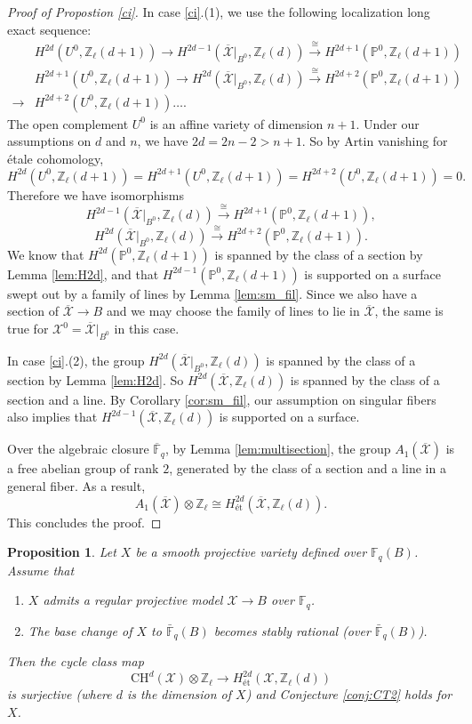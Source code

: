 \documentclass{amsart}
\newtheorem{prop}[theorem]{Proposition}
\theoremstyle{definition}
\theoremstyle{remark}
\newcommand{\mbb}{\mathbb}
\newcommand{\FF}{\mbb{F}}
\newcommand{\ZZ}{\mbb{Z}}
\newcommand{\PP}{\mbb{P}}
\newcommand{\mc}{\mathcal}
\newcommand{\mcX}{\mc{X}}
\newcommand{\et}{\text{\'et}}
\begin{document}
\begin{proof}[Proof of Propostion \ref{ci}]
In case \ref{ci}.(1), we use the following localization long exact sequence:
\begin{align*}
&H^{2d}(U^0, \ZZ_\ell(d+1))\to H^{2d-1}(\overline{\mcX}|_{B^0}, \ZZ_\ell(d)) \xrightarrow{\cong} H^{2d+1}(\PP^0, \ZZ_\ell(d+1)) \\
    &H^{2d+1}(U^0, \ZZ_\ell(d+1))\to H^{2d}(\overline{\mcX}|_{B^0}, \ZZ_\ell(d)) \xrightarrow{\cong} H^{2d+2}(\PP^0, \ZZ_\ell(d+1)) \\
    \to &H^{2d+2}(U^0, \ZZ_\ell(d+1))\ldots .
\end{align*}
The open complement $U^0$ is an affine variety of dimension $n+1$. Under our assumptions on $d$ and $n$, we have $2d=2n-2>n+1$.
So by Artin vanishing for \'etale cohomology, 
\[
H^{2d}(U^0, \ZZ_\ell(d+1))= H^{2d+1}(U^0, \ZZ_\ell(d+1))= H^{2d+2}(U^0, \ZZ_\ell(d+1))=0.
\]
Therefore we have isomorphisms
\[
H^{2d-1}(\overline{\mcX}|_{B^0}, \ZZ_\ell(d)) \xrightarrow{\cong} H^{2d+1}(\PP^0, \ZZ_\ell(d+1)), \]
\[ H^{2d}(\overline{\mcX}|_{B^0}, \ZZ_\ell(d)) \xrightarrow{\cong} H^{2d+2}(\PP^0, \ZZ_\ell(d+1)).
\]
We know that $H^{2d}(\PP^0, \ZZ_\ell(d+1))$ is spanned by the class of a section by Lemma \ref{lem:H2d}, and that $H^{2d-1}(\PP^0, \ZZ_\ell(d+1))$ is supported on a surface swept out by a family of lines by Lemma \ref{lem:sm_fil}.
Since we also have a section of $\overline{\mcX} \to B$ and we may choose the family of lines to lie in $\overline{\mcX}$, the same is true for $\mcX^0=\overline{\mcX}|_{B^0}$ in this case.


In case \ref{ci}.(2), the group $H^{2d}(\overline{\mcX}|_{B^0}, \ZZ_\ell(d))$ is spanned by the class of a section by Lemma \ref{lem:H2d}.
So $H^{2d}(\overline{\mcX}, \ZZ_\ell(d))$ is spanned by the class of a section and a line.
By Corollary \ref{cor:sm_fil}, our assumption on singular fibers also implies that $H^{2d-1}(\overline{\mcX}, \ZZ_\ell(d))$ is supported on a surface.


Over the algebraic closure $\overline{\FF}_q$,  by Lemma \ref{lem:multisection}, the group $A_1(\overline{\mcX})$ is a free abelian group of rank $2$, generated by the class of a section and a line in a general fiber.
As a result, \[
A_1(\overline{\mcX})\otimes \ZZ_\ell \cong H^{2d}_\et(\overline{\mcX}, \ZZ_\ell(d)).\]
This concludes the proof.
\end{proof}


\begin{prop}
Let $X$ be a smooth projective variety defined over $\FF_q(B)$.
Assume that 
\begin{enumerate}
    \item $X$ admits a regular projective model $\mcX \to B$ over $\FF_q$.
    \item The base change of $X$ to $\bar{\FF}_q(B)$ becomes stably rational (over $\bar{\FF}_q(B)$).
\end{enumerate}
Then the cycle class map
\[
\text{CH}^d(\mcX) \otimes \ZZ_\ell \to H^{2d}_{\text{{\'e}t}}(\mcX, \ZZ_\ell(d))
\]
is surjective (where $d$ is the dimension of $X$) and Conjecture \ref{conj:CT2} holds for $X$.
\end{prop}
\end{document}
